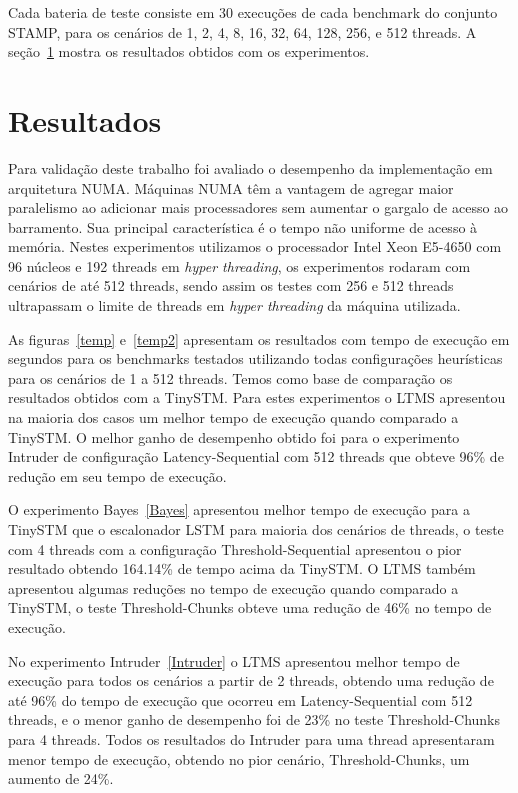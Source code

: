 \documentclass[diss,capa]{texufpel}
\begin{document}
Cada bateria de teste consiste em 30 execuções de cada benchmark do conjunto STAMP, para os cenários de 1, 2, 4, 8, 16, 32, 64, 128, 256, e 512 threads. A seção~\ref{resultados} mostra os resultados obtidos com os experimentos.

\section{Resultados}
\label{resultados}

Para validação deste trabalho foi avaliado o desempenho da implementação em arquitetura NUMA. Máquinas NUMA têm a vantagem de agregar maior paralelismo ao adicionar mais processadores sem aumentar o gargalo de acesso ao barramento. Sua principal característica é o tempo não uniforme de acesso à memória. Nestes experimentos utilizamos o processador Intel Xeon E5-4650 com 96 núcleos e 192 threads em \emph{hyper threading}, os experimentos rodaram com cenários de até 512 threads, sendo assim os testes com 256 e 512 threads ultrapassam o limite de threads em \emph{hyper threading} da máquina utilizada.

As figuras~\ref{temp} e~\ref{temp2} apresentam os resultados com tempo de execução em segundos para os benchmarks testados utilizando todas configurações heurísticas para os cenários de 1 a 512 threads. Temos como base de comparação os resultados obtidos com a TinySTM. Para estes experimentos o LTMS apresentou na maioria dos casos um melhor tempo de execução quando comparado a TinySTM. O melhor ganho de desempenho obtido foi para o experimento Intruder de configuração Latency-Sequential com 512 threads que obteve 96\% de redução em seu tempo de execução.

O experimento Bayes~\ref{Bayes} apresentou melhor tempo de execução para a TinySTM que o escalonador LSTM para maioria dos cenários de threads, o teste com 4 threads com a configuração Threshold-Sequential apresentou o pior resultado obtendo 164.14\% de tempo acima da TinySTM. O LTMS também apresentou algumas reduções no tempo de execução quando comparado a TinySTM, o teste Threshold-Chunks obteve uma redução de 46\% no tempo de execução.

No experimento Intruder~\ref{Intruder} o LTMS apresentou melhor tempo de execução para todos os cenários a partir de 2 threads, obtendo uma redução de até 96\% do tempo de execução que ocorreu em Latency-Sequential com 512 threads, e o menor ganho de desempenho foi de 23\% no teste Threshold-Chunks para 4 threads. Todos os resultados do Intruder para uma thread apresentaram menor tempo de execução, obtendo no pior cenário, Threshold-Chunks, um aumento de 24\%.
\end{document}
